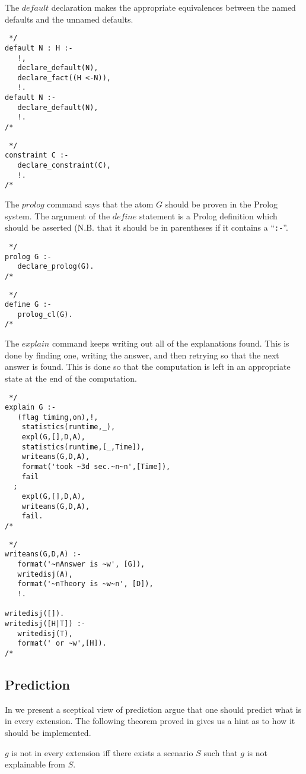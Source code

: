 The $default$ declaration makes the appropriate equivalences between the
named defaults and the unnamed defaults.
\begin{verbatim} */
default N : H :-
   !,
   declare_default(N),
   declare_fact((H <-N)),
   !.
default N :-
   declare_default(N),
   !.
/* \end{verbatim}
\begin{verbatim} */
constraint C :-
   declare_constraint(C),
   !.
/* \end{verbatim}
The $prolog$ command says that the atom $G$ should be proven in the
Prolog system. The argument of the $define$ statement is a Prolog
definition which should be asserted (N.B. that it should be in
parentheses if it contains a ``{\tt :-}''.
\begin{verbatim} */
prolog G :-
   declare_prolog(G).
/* \end{verbatim}
\begin{verbatim} */
define G :-
   prolog_cl(G).
/* \end{verbatim}

The $explain$ command keeps writing out all of the explanations found.
This is done by finding one, writing the answer, and then retrying so that
the next answer is found. This is done so that the computation is left in
an appropriate state at the end of the computation.
\begin{verbatim} */
explain G :-
   (flag timing,on),!,
    statistics(runtime,_),
    expl(G,[],D,A),
    statistics(runtime,[_,Time]),
    writeans(G,D,A),
    format('took ~3d sec.~n~n',[Time]),
    fail
  ;
    expl(G,[],D,A),
    writeans(G,D,A),
    fail.
/* \end{verbatim}
\begin{verbatim} */
writeans(G,D,A) :-
   format('~nAnswer is ~w', [G]),
   writedisj(A),
   format('~nTheory is ~w~n', [D]),
   !.

writedisj([]).
writedisj([H|T]) :-
   writedisj(T),
   format(' or ~w',[H]).
/* \end{verbatim}

\subsection{Prediction}
In \cite{poole:lf} we present a sceptical view of prediction
argue that one should predict what is in every extension.
The following theorem proved in \cite{poole:lf} gives us a hint
as to how it should be implemented.
\begin{theorem} \label{everythm}
$g$ is not in every extension iff there exists a scenario $S$ such
that $g$ is not explainable from $S$.
\end{theorem}

